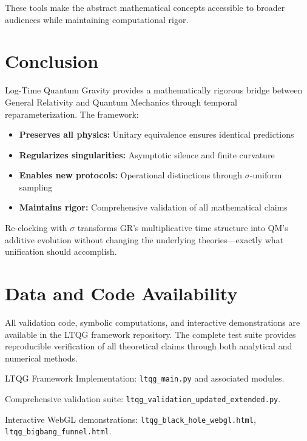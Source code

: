 \documentclass[11pt]{article}
\begin{document}
These tools make the abstract mathematical concepts accessible to broader audiences while maintaining computational rigor.

\section{Conclusion}

Log-Time Quantum Gravity provides a mathematically rigorous bridge between General Relativity and Quantum Mechanics through temporal reparameterization. The framework:

\begin{itemize}
\item \textbf{Preserves all physics:} Unitary equivalence ensures identical predictions
\item \textbf{Regularizes singularities:} Asymptotic silence and finite curvature 
\item \textbf{Enables new protocols:} Operational distinctions through $\sigma$-uniform sampling
\item \textbf{Maintains rigor:} Comprehensive validation of all mathematical claims
\end{itemize}

Re-clocking with $\sigma$ transforms GR's multiplicative time structure into QM's additive evolution without changing the underlying theories—exactly what unification should accomplish.

\section{Data and Code Availability}

All validation code, symbolic computations, and interactive demonstrations are available in the LTQG framework repository. The complete test suite provides reproducible verification of all theoretical claims through both analytical and numerical methods.


\begin{thebibliography}{99}

LTQG Framework Implementation: \texttt{ltqg\_main.py} and associated modules.

Comprehensive validation suite: \texttt{ltqg\_validation\_updated\_extended.py}.

Interactive WebGL demonstrations: \texttt{ltqg\_black\_hole\_webgl.html}, \texttt{ltqg\_bigbang\_funnel.html}.

\end{thebibliography}
\end{document}
